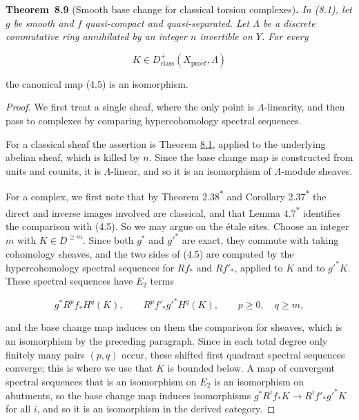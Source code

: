 \documentclass[11pt]{article}
\newenvironment{bpstatement}[2]{\par\addvspace{0.6\baselineskip}\noindent\textbf{#1}#2\textbf{.}\enspace\ignorespaces}
  {\par\addvspace{0.4\baselineskip}}
\newenvironment{bpstatementit}[2]{\begin{bpstatement}{#1}{#2}\itshape\ignorespaces}{\end{bpstatement}}
\newcommand{\bpout}[1]{#1\textsuperscript{\hyperlink{bp-outside}{\ensuremath{\ast}}}}
\begin{document}
\label{bp38}%
\begin{bpstatementit}{Theorem~8.9}{ (Smooth base change for classical torsion complexes)}
In (8.1), let \(g\) be smooth and \(f\) quasi-compact and quasi-separated. Let \(\Lambda\) be a discrete commutative ring annihilated by an integer \(n\) invertible on \(Y\). For every

\[
K\in D^+_{\mathrm{class}}(X_{\mathrm{pro}\acute{e}t},\Lambda)
\]

the canonical map (4.5) is an isomorphism.
\end{bpstatementit}

\begin{proof}[{Proof}]\label{bp39}%
We first treat a single sheaf, where the only point is \(\Lambda\)-linearity, and then pass to complexes by comparing hypercohomology spectral sequences.

For a classical sheaf the assertion is Theorem \hyperref[bp7]{8.1}, applied to the underlying abelian sheaf, which is killed by \(n\). Since the base change map is constructed from units and counits, it is \(\Lambda\)-linear, and so it is an isomorphism of \(\Lambda\)-module sheaves.

For a complex, we first note that by Theorem \bpout{2.38} and Corollary \bpout{2.37} the direct and inverse images involved are classical, and that Lemma \bpout{4.7} identifies the comparison with (4.5). So we may argue on the étale sites. Choose an integer \(m\) with \(K\in D^{\geq m}\). Since both \(g^*\) and \(g'^*\) are exact, they commute with taking cohomology sheaves, and the two sides of (4.5) are computed by the hypercohomology spectral sequences for \(Rf_*\) and \(Rf'_*\), applied to \(K\) and to \(g'^*K\). These spectral sequences have \(E_2\) terms

\[
g^*R^pf_*H^q(K),\qquad R^pf'_*g'^*H^q(K),
\qquad p\geq0,\quad q\geq m,
\]

and the base change map induces on them the comparison for sheaves, which is an isomorphism by the preceding paragraph. Since in each total degree only finitely many pairs \((p,q)\) occur, these shifted first quadrant spectral sequences converge; this is where we use that \(K\) is bounded below. A map of convergent spectral sequences that is an isomorphism on \(E_2\) is an isomorphism on abutments, so the base change map induces isomorphisms \(g^*R^if_*K\to R^if'_*g'^*K\) for all \(i\), and so it is an isomorphism in the derived category.
\end{proof}
\end{document}
